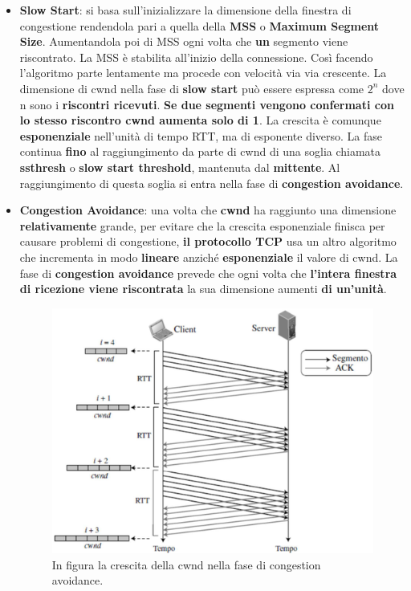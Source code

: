 \documentclass[11pt,a4paper,oneside]{book}
\theoremstyle{definition}
\begin{document}
\begin{itemize}
	\item \textbf{Slow Start}: si basa sull'inizializzare la dimensione della finestra di congestione rendendola pari a quella della \textbf{MSS} o \textbf{Maximum Segment Size}. Aumentandola poi di MSS ogni volta che \textbf{un} segmento viene riscontrato. La MSS è stabilita all'inizio della connessione. Così facendo l'algoritmo parte lentamente ma procede con velocità via via crescente. La dimensione di cwnd nella fase di \textbf{slow start} può essere espressa come $2^{n}$ dove n sono i \textbf{riscontri ricevuti}.\textbf{ Se due segmenti vengono confermati con lo stesso riscontro cwnd aumenta solo di 1}. La crescita è comunque \textbf{esponenziale} nell'unità di tempo RTT, ma di esponente diverso. La fase continua \textbf{fino} al raggiungimento da parte di cwnd di una soglia chiamata \textbf{ssthresh} o \textbf{slow start threshold}, mantenuta dal \textbf{mittente}. Al raggiungimento di questa soglia si entra nella fase di \textbf{congestion avoidance}.
	\item \textbf{Congestion Avoidance}: una volta che \textbf{cwnd} ha raggiunto una dimensione \textbf{relativamente} grande, per evitare che la crescita esponenziale finisca per causare problemi di congestione, \textbf{il protocollo TCP} usa un altro algoritmo che incrementa in modo \textbf{lineare} anziché \textbf{esponenziale} il valore di cwnd. La fase di \textbf{congestion avoidance} prevede che ogni volta che \textbf{l'intera finestra di ricezione viene riscontrata} la sua dimensione aumenti \textbf{di un'unità}.
	      \begin{figure}[!h]
		      \includegraphics[scale=0.35]{Immagini/CA_tcp.png}
		      \centering
		      \caption{In figura la crescita della cwnd nella fase di congestion avoidance.}
	      \end{figure}\newline


\end{itemize}
\end{document}
